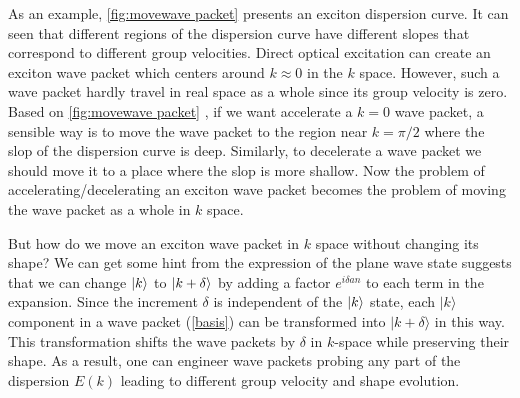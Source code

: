 As an example, \autoref{fig:movewave packet} presents an exciton dispersion curve. It can seen  that different
 regions of the dispersion curve have different slopes that correspond to different group velocities. 
Direct optical excitation can create an exciton wave packet which centers around $k\approx 0$ in the $k$ space. 
However, such a wave packet hardly travel in real space as a whole since its group velocity is zero. Based on 
\autoref{fig:movewave packet} , if we want accelerate a $k = 0$ wave packet, a sensible way is to move the 
wave packet to the region near $k=\pi/2$ where the slop of the dispersion curve is deep. Similarly, to decelerate a
 wave packet we should move it to a place where the slop is more shallow. Now the problem of
accelerating/decelerating an exciton wave packet becomes the problem of moving the wave packet  as
a whole in $k$ space. 




But how do we move an exciton wave packet in $k$ space without changing its shape? We can get some hint from the
expression of the plane wave state
 suggests that we can change $| k \rangle$ to $| k+\delta \rangle$ by adding a
 factor $e^{i \delta a n}$ to each term in the expansion.  Since the increment $\delta$ is independent of the $| k \rangle$
state, 
each $| k\rangle$ component in a wave packet (\autoref{basis}) can be transformed into $|
k+\delta\rangle$ in this way. This transformation shifts the
wave packets by $\delta$ in $k$-space while preserving their
shape. As a result, one can engineer wave packets probing any part
of the dispersion $E(k)$ leading to different group velocity and
shape evolution. 

